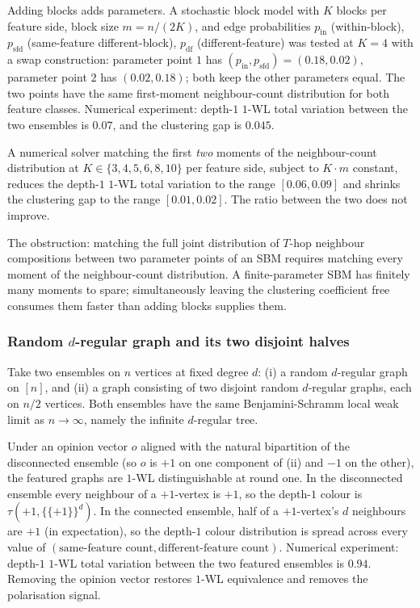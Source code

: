 Adding blocks adds parameters. A stochastic block model with $K$
blocks per feature side, block size $m = n/(2K)$, and edge
probabilities $p_{\mathrm{in}}$ (within-block), $p_{\mathrm{sfd}}$
(same-feature different-block), $p_{\mathrm{df}}$ (different-feature)
was tested at $K = 4$ with a swap construction: parameter point $1$
has $(p_{\mathrm{in}}, p_{\mathrm{sfd}}) = (0.18, 0.02)$, parameter
point $2$ has $(0.02, 0.18)$; both keep the other parameters equal.
The two points have the same first-moment neighbour-count
distribution for both feature classes. Numerical experiment: depth-$1$
$1$-WL total variation between the two ensembles is $0.07$, and the
clustering gap is $0.045$.

A numerical solver matching the first \emph{two} moments of the
neighbour-count distribution at $K \in \{3, 4, 5, 6, 8, 10\}$ per
feature side, subject to $K \cdot m$ constant, reduces the
depth-$1$ $1$-WL total variation to the range $[0.06, 0.09]$ and
shrinks the clustering gap to the range $[0.01, 0.02]$. The ratio
between the two does not improve.

The obstruction: matching the full joint distribution of $T$-hop
neighbour compositions between two parameter points of an SBM
requires matching every moment of the neighbour-count distribution.
A finite-parameter SBM has finitely many moments to spare;
simultaneously leaving the clustering coefficient free consumes them
faster than adding blocks supplies them.

\subsubsection*{Random $d$-regular graph and its two disjoint halves}

Take two ensembles on $n$ vertices at fixed degree $d$: (i) a random
$d$-regular graph on $[n]$, and (ii) a graph consisting of two
disjoint random $d$-regular graphs, each on $n/2$ vertices. Both
ensembles have the same Benjamini-Schramm local weak limit as $n
\to \infty$, namely the infinite $d$-regular tree.

Under an opinion vector $o$ aligned with the natural bipartition of
the disconnected ensemble (so $o$ is $+1$ on one component of (ii)
and $-1$ on the other), the featured graphs are $1$-WL
distinguishable at round one. In the disconnected ensemble every
neighbour of a $+1$-vertex is $+1$, so the depth-$1$ colour is
$\tau(+1, \{\!\{+1\}\!\}^d)$. In the connected ensemble, half of a
$+1$-vertex's $d$ neighbours are $+1$ (in expectation), so the
depth-$1$ colour distribution is spread across every value of
$(\text{same-feature count}, \text{different-feature count})$.
Numerical experiment: depth-$1$ $1$-WL total variation between the
two featured ensembles is $0.94$. Removing the opinion vector
restores $1$-WL equivalence and removes the polarisation signal.

